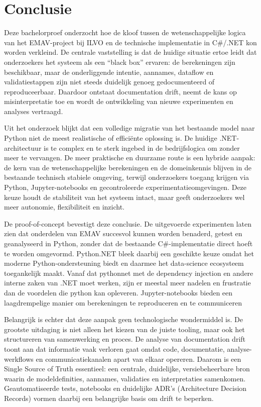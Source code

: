
\chapter{Conclusie}
\label{ch:conclusie}
Deze bachelorproef onderzocht hoe de kloof tussen de wetenschappelijke logica van het EMAV-project bij ILVO en de technische implementatie in C\#/.NET kon worden verkleind. 
De centrale vaststelling is dat de huidige situatie ertoe leidt dat onderzoekers het systeem als een “black box” ervaren: de berekeningen zijn beschikbaar, maar de onderliggende intentie, aannames, dataflow en validatiestappen zijn niet steeds duidelijk genoeg gedocumenteerd of reproduceerbaar. 
Daardoor ontstaat documentation drift, neemt de kans op misinterpretatie toe en wordt de ontwikkeling van nieuwe experimenten en analyses vertraagd.

Uit het onderzoek blijkt dat een volledige migratie van het bestaande model naar Python niet de meest realistische of efficiënte oplossing is. 
De huidige .NET-architectuur is te complex en te sterk ingebed in de bedrijfslogica om zonder meer te vervangen. 
De meer praktische en duurzame route is een hybride aanpak: de kern van de wetenschappelijke berekeningen en de domeinkennis blijven in de bestaande technisch stabiele omgeving, terwijl onderzoekers toegang krijgen via Python, Jupyter-notebooks en gecontroleerde experimentatieomgevingen. 
Deze keuze houdt de stabiliteit van het systeem intact, maar geeft onderzoekers wel meer autonomie, flexibiliteit en inzicht.

De proof-of-concept bevestigt deze conclusie. 
De uitgevoerde experimenten laten zien dat onderdelen van EMAV succesvol kunnen worden benaderd, getest en geanalyseerd in Python, zonder dat de bestaande C\#-implementatie direct hoeft te worden omgevormd. 
Python.NET bleek daarbij een geschikte keuze omdat het moderne Python-ondersteuning biedt en daarmee het data-science ecosysteem toegankelijk maakt. 
Vanaf dat pythonnet met de dependency injection en andere interne zaken van .NET moet werken, zijn er meestal meer nadelen en frustratie dan de voordelen die python kan opleveren. 
Jupyter-notebooks bieden een laagdrempelige manier om berekeningen te reproduceren en te communiceren

Belangrijk is echter dat deze aanpak geen technologische wondermiddel is. 
De grootste uitdaging is niet alleen het kiezen van de juiste tooling, maar ook het structureren van samenwerking en proces. 
De analyse van documentation drift toont aan dat informatie vaak verloren gaat omdat code, documentatie, analyse-werkflows en communicatiekanalen apart van elkaar opereren. 
Daarom is een Single Source of Truth essentieel: een centrale, duidelijke, versiebeheerbare bron waarin de modeldefinities, aannames, validaties en interpretaties samenkomen. 
Geautomatiseerde tests, notebooks en duidelijke ADR’s (Architecture Decision Records) vormen daarbij een belangrijke basis om drift te beperken.

